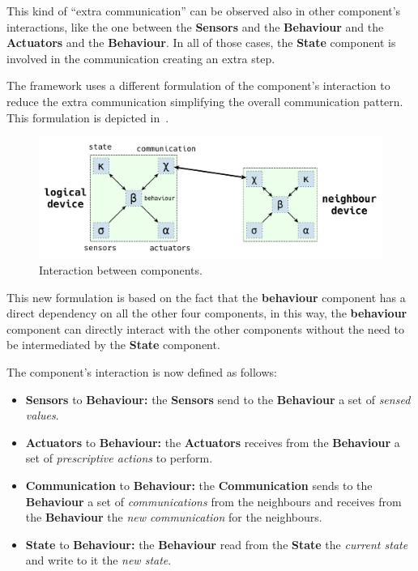 This kind of ``extra communication'' can be observed also in other component's interactions, like the one between the \textbf{Sensors} and the
\textbf{Behaviour} and the \textbf{Actuators} and the \textbf{Behaviour}. In all of those cases, the \textbf{State} component is involved in the
communication creating an extra step.

The framework uses a different formulation of the component's interaction to reduce the extra communication simplifying the overall communication
pattern. This formulation is depicted in~.

\begin{figure}
	\centering
	\includegraphics[width=\textwidth]{figures/framework-components-interactions.pdf}
	\caption{Interaction between components.}
	\label{fig:framework-components-interaction-2}
\end{figure}

This new formulation is based on the fact that the \textbf{behaviour} component has a direct dependency on all the other four components,
in this way, the \textbf{behaviour} component can directly interact with the other components without the need to be intermediated by the
\textbf{State} component.

The component's interaction is now defined as follows:
\begin{itemize}
	\item \textbf{Sensors} to \textbf{Behaviour:} the \textbf{Sensors} send to the \textbf{Behaviour} a set of \textit{sensed values}.
	\item \textbf{Actuators} to \textbf{Behaviour:} the \textbf{Actuators} receives from the \textbf{Behaviour} a set of \textit{prescriptive
		      actions} to perform.
	\item \textbf{Communication} to \textbf{Behaviour:} the \textbf{Communication} sends to the \textbf{Behaviour} a set of \textit{communications}
	      from the neighbours and receives from the \textbf{Behaviour} the \textit{new communication} for the neighbours.
	      \item\textbf{State} to \textbf{Behaviour:} the \textbf{Behaviour} read from the \textbf{State} the \textit{current state} and write to it
	      the \textit{new state}.
\end{itemize}

